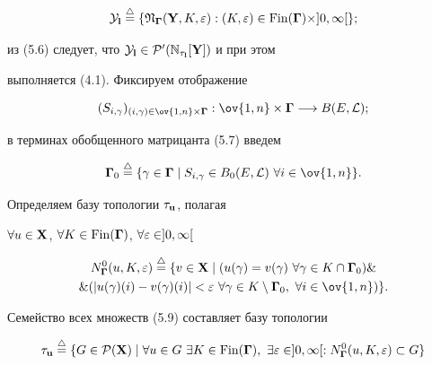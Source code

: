 \begin{equation}


{{\cal Y}_{\bold l}} \stac \{{{\frak N}_{\mG}}({\bold Y},K,\var):


(K,\var) \in {\Fin}(\mG) \times ]0,\infty[\};


\end{equation}


из (5.6) следует, что ${{\cal Y}_{\bold l}} \in


{{\cal P}'}({{\Bbb N}_{{\tau}_{\bold l}}}[{\bold Y}])$ и при этом


выполняется (4.1). Фиксируем отображение


\begin{equation}


{(S_{i,\gamma})_{(i,\gamma) \in \ov{1,n} \times \mG}}:


\ov{1,n} \times \mG \lo B(E,{\cal L});


\end{equation}


в терминах обобщенного матрицанта (5.7) введем


\begin{equation}


{{\mG}_0} \stac \{\gamma \in \mG \mid


{S_{i,\gamma}} \in {B_0}(E,{\cal L})\ \fo{i} \in \ov{1,n}\}.


\end{equation}


Определяем базу топологии ${{\tau}_{\bold u}}$, полагая


$\fo{u} \in {\bold X}$, $\fo{K} \in {\Fin}(\mG)$, $\fo{\var} \in


]0,\infty[$


\begin{multline}


{N_{\mG}^0}(u,K,\var) \stac \{v \in {\bold X} \mid


({u(\gamma)} = {v(\gamma)}\ \fo{\gamma} \in


K \cap {{\mG}_0}) \& \\


\& (|{u(\gamma)(i)} - {v(\gamma)(i)}| < \var\ \fo{\gamma} \in


K \setminus {{\mG}_0}, \ \fo{i} \in \ov{1,n})\}.


\end{multline}


Семейство всех множеств (5.9) составляет базу топологии


\begin{equation}


{{\tau}_{\bold u}} \stac \{G \in {{\cal P}({\bold X})} \mid \fo{u} \in G


\ \exi{K} \in {\Fin}(\mG), \ \exi{\var} \in ]0,\infty[:


{N_{\mG}^0}(u,K,\var) \subset G\}


\end{equation}


